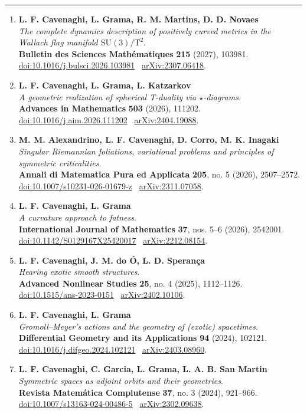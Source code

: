 \documentclass[10pt,a4paper]{article}
\newcommand{\sect}[1]{\vspace{10pt}{\large\bfseries\color{accent}#1}\par\vspace{2pt}\hrule\vspace{5pt}}
\newcommand{\paper}[3]{\Needspace{4\baselineskip}\item \textbf{#1}\\[-1pt]\emph{#2}.\\[-1pt]{\small #3}}
\begin{document}
\sect{Published Journal Articles (13)}
\begin{enumerate}[leftmargin=2.0em,label=\textcolor{accent}{\arabic*.},labelsep=.65em,itemsep=5pt,topsep=4pt,parsep=0pt]
\paper{L. F. Cavenaghi, L. Grama, R. M. Martins, D. D. Novaes}{The complete dynamics description of positively curved metrics in the Wallach flag manifold $\mathrm{SU}(3)/\mathrm{T}^2$}{\textbf{Bulletin des Sciences Math\'ematiques} \textbf{215} (2027), 103981. \href{https://doi.org/10.1016/j.bulsci.2026.103981}{doi:10.1016/j.bulsci.2026.103981} \textbar\ \href{https://arxiv.org/abs/2307.06418}{arXiv:2307.06418}.}
\paper{L. F. Cavenaghi, L. Grama, L. Katzarkov}{A geometric realization of spherical T-duality via $\star$-diagrams}{\textbf{Advances in Mathematics} \textbf{503} (2026), 111202. \href{https://doi.org/10.1016/j.aim.2026.111202}{doi:10.1016/j.aim.2026.111202} \textbar\ \href{https://arxiv.org/abs/2404.19088}{arXiv:2404.19088}.}
\paper{M. M. Alexandrino, L. F. Cavenaghi, D. Corro, M. K. Inagaki}{Singular Riemannian foliations, variational problems and principles of symmetric criticalities}{\textbf{Annali di Matematica Pura ed Applicata} \textbf{205}, no. 5 (2026), 2507--2572. \href{https://doi.org/10.1007/s10231-026-01679-z}{doi:10.1007/s10231-026-01679-z} \textbar\ \href{https://arxiv.org/abs/2311.07058}{arXiv:2311.07058}.}
\paper{L. F. Cavenaghi, L. Grama}{A curvature approach to fatness}{\textbf{International Journal of Mathematics} \textbf{37}, nos. 5--6 (2026), 2542001. \href{https://doi.org/10.1142/S0129167X25420017}{doi:10.1142/S0129167X25420017} \textbar\ \href{https://arxiv.org/abs/2212.08154}{arXiv:2212.08154}.}
\paper{L. F. Cavenaghi, J. M. do \'{O}, L. D. Speran\c{c}a}{Hearing exotic smooth structures}{\textbf{Advanced Nonlinear Studies} \textbf{25}, no. 4 (2025), 1112--1126. \href{https://doi.org/10.1515/ans-2023-0151}{doi:10.1515/ans-2023-0151} \textbar\ \href{https://arxiv.org/abs/2402.10106}{arXiv:2402.10106}.}
\paper{L. F. Cavenaghi, L. Grama}{Gromoll--Meyer's actions and the geometry of (exotic) spacetimes}{\textbf{Differential Geometry and its Applications} \textbf{94} (2024), 102121. \href{https://doi.org/10.1016/j.difgeo.2024.102121}{doi:10.1016/j.difgeo.2024.102121} \textbar\ \href{https://arxiv.org/abs/2403.08960}{arXiv:2403.08960}.}
\paper{L. F. Cavenaghi, C. Garcia, L. Grama, L. A. B. San Martin}{Symmetric spaces as adjoint orbits and their geometries}{\textbf{Revista Matem\'atica Complutense} \textbf{37}, no. 3 (2024), 921--966. \href{https://doi.org/10.1007/s13163-024-00486-5}{doi:10.1007/s13163-024-00486-5} \textbar\ \href{https://arxiv.org/abs/2302.09638}{arXiv:2302.09638}.}

\end{enumerate}
\end{document}
